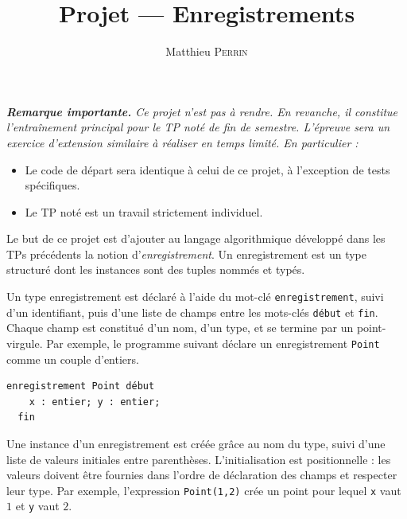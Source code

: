 \documentclass[correction]{td}
\author{Matthieu \textsc{Perrin}}
\title{Projet --- Enregistrements}
\begin{document}
\maketitle

\vspace{-5mm}

\begin{center}
  \begin{minipage}{.9\textwidth}
    \it
    \textbf{Remarque importante.} Ce projet n'est pas à rendre. En revanche, il constitue l'entraînement principal pour le TP noté de fin de semestre.
    L'épreuve sera un exercice d'extension similaire à réaliser en temps limité. En particulier :
    \begin{itemize}
    \item Le code de départ sera identique à celui de ce projet, à l'exception de tests spécifiques.
    \item Le TP noté est un travail strictement individuel.
    \end{itemize}
  \end{minipage}
\end{center}

\vspace{3mm}

Le but de ce projet est d'ajouter au langage algorithmique développé dans les TPs précédents la notion d'\emph{enregistrement}.
Un enregistrement est un type structuré dont les instances sont des tuples nommés et typés.

Un type enregistrement est déclaré à l'aide du mot-clé \lstinline|enregistrement|, suivi d'un identifiant,
puis d'une liste de champs entre les mots-clés \lstinline|début| et \lstinline|fin|.
Chaque champ est constitué d'un nom, d'un type, et se termine par un point-virgule. Par exemple, le programme suivant déclare un enregistrement
\lstinline{Point} comme un couple d'entiers. 

\begin{lstlisting}[gobble=2]
  enregistrement Point début
    x : entier; y : entier;
  fin
\end{lstlisting}

Une instance d'un enregistrement est créée grâce au nom du type, suivi d'une liste de valeurs initiales entre parenthèses.
L'initialisation est positionnelle : les valeurs doivent être fournies dans l'ordre de déclaration des champs et respecter leur type.
Par exemple, l'expression \lstinline{Point(1,2)} crée un point pour lequel \lstinline{x} vaut $1$ et \lstinline{y} vaut $2$.
\end{document}

